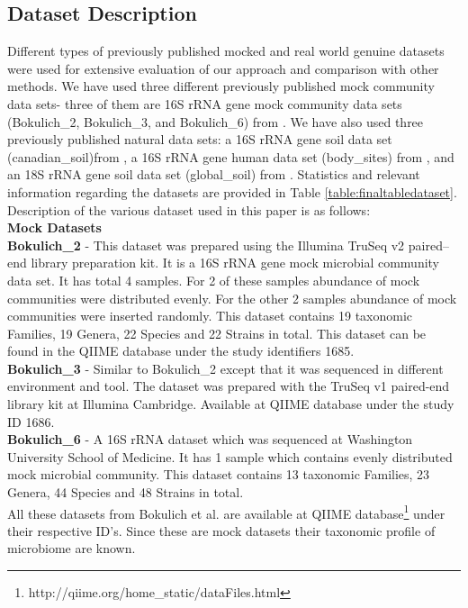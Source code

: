 \documentclass[10pt, conference, compsocconf]{IEEEtran}
\begin{document}
\subsection{Dataset Description}
Different types of previously published mocked and real world genuine datasets were used for extensive evaluation of our approach and comparison with other methods. We have used three different previously published mock community data sets- three of them are 16S rRNA gene mock community data sets (Bokulich\_2, Bokulich\_3, and Bokulich\_6) from \cite{MARmockDatasetRef}. We have also used three previously published natural data sets: a 16S rRNA gene soil data set (canadian\_soil)from \cite{MARcanadianSoil}, a 16S rRNA gene human data set (body\_sites) from \cite{MARbodySites}, and an 18S rRNA gene soil data set (global\_soil) from \cite{MARglobalSoil}. Statistics and relevant information regarding the datasets are provided in Table \ref{table:finaltabledataset}. Description of the various dataset used in this paper is as follows:\\

\textbf{Mock Datasets}\\
\hspace*{4mm}\textbf{Bokulich\_2} - This dataset was prepared using the Illumina TruSeq v2 paired--end library preparation kit. It is a 16S rRNA gene mock microbial community data set. It has total 4 samples. For 2 of these samples abundance of mock communities were distributed evenly. For the other 2 samples abundance of mock communities were inserted randomly. This dataset contains 19 taxonomic Families, 19 Genera, 22 Species and 22 Strains in total. This dataset can be found in the QIIME database under the study identifiers 1685.\\
\hspace*{4mm}\textbf{Bokulich\_3} - Similar to Bokulich\_2 except that it was sequenced in different environment and tool. The dataset was prepared with the TruSeq v1 paired-end library kit at Illumina Cambridge. Available at QIIME database under the study ID 1686.\\
\hspace*{4mm}\textbf{Bokulich\_6} - A 16S rRNA dataset which was sequenced at Washington University School of Medicine. It has 1 sample which contains evenly distributed mock microbial community. This dataset contains 13 taxonomic Families, 23 Genera, 44 Species and 48 Strains in total.\\
All these datasets from Bokulich et al.\cite{MARmockDatasetRef} are available at QIIME database\footnote{http://qiime.org/home\_static/dataFiles.html} under their respective ID's. Since these are mock datasets their taxonomic profile of microbiome are known.\\
\end{document}

